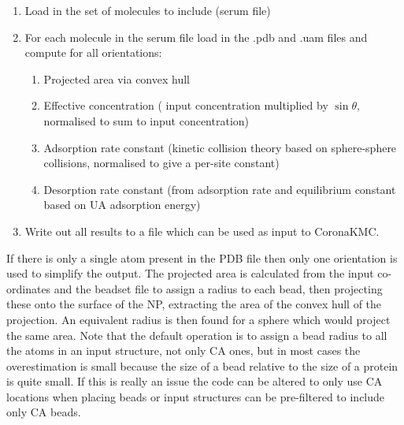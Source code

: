 \documentclass[10pt,a4paper,onecolumn]{report}
\begin{document}
\begin{enumerate}
\item Load in the set of molecules to include (serum file)
\item For each molecule in the serum file load in the .pdb and .uam files and compute for all orientations:
\begin{enumerate}
\item Projected area via convex hull
\item Effective concentration ( input concentration multiplied by $\sin \theta$, normalised to sum to input concentration)
\item Adsorption rate constant (kinetic collision theory based on sphere-sphere collisions, normalised to give a per-site constant)
\item Desorption rate constant (from adsorption rate and equilibrium constant based on UA adsorption energy)
\end{enumerate}
\item Write out all results to a file which can be used as input to CoronaKMC.
 \end{enumerate}
If there is only a single atom present in the PDB file then only one orientation is used to simplify the output. The projected area is calculated from the input co-ordinates and the beadset file to assign a radius to each bead, then projecting these onto the surface of the NP, extracting the area of the convex hull of the projection. An equivalent radius is then found for a sphere which would project the same area. Note that the default operation is to assign a bead radius to all the atoms in an input structure, not only CA ones, but in most cases the overestimation is small because the size of a bead relative to the size of a protein is quite small. If this is really an issue the code can be altered to only use CA locations when placing beads or input structures can be pre-filtered to include only CA beads.
 
 
\end{document}
